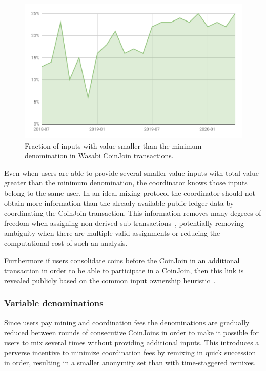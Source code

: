\documentclass{article}
\begin{document}
\begin{figure}[h!]
    \centering
    \includegraphics[scale=0.4]{Figures/SmallValueInputsWasabi.pdf}
    \caption{Fraction of inputs with value smaller than the minimum denomination in Wasabi CoinJoin transactions.}
    \label{fig:minimumdenomination}
\end{figure}

Even when users are able to provide several smaller value inputs with total value greater than the minimum denomination, the coordinator knows those inputs belong to the same user. In an ideal mixing protocol the coordinator should not obtain more information than the already available public ledger data by coordinating the CoinJoin transaction. This information removes many degrees of freedom when assigning non-derived sub-transactions~\cite{maurer2017anonymous}, potentially removing ambiguity when there are multiple valid assignments or reducing the computational cost of such an analysis.

Furthermore if users consolidate coins before the CoinJoin in an additional transaction in order to be able to participate in a CoinJoin, then this link is revealed publicly based on the common input ownership heuristic~\cite{meiklejohn2013fistful}.

\subsubsection{Variable denominations} Since users pay mining and coordination fees the denominations are gradually reduced between rounds of consecutive CoinJoins in order to make it possible for users to mix several times without providing additional inputs. This introduces a perverse incentive to minimize coordination fees by remixing in quick succession in order, resulting in a smaller anonymity set than with time-staggered remixes.
\end{document}
